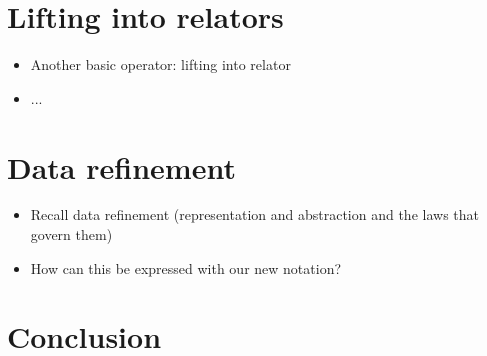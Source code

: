\documentclass[runningheads,a4paper]{llncs}
\begin{document}
\section{Lifting into relators}

\begin{itemize}
\item Another basic operator: lifting into relator
\item ...
\end{itemize}

\section{Data refinement}

\begin{itemize}
\item Recall data refinement (representation and abstraction and the laws that govern them)
\item How can this be expressed with our new notation?
\end{itemize}

\section{Conclusion}
\end{document}
